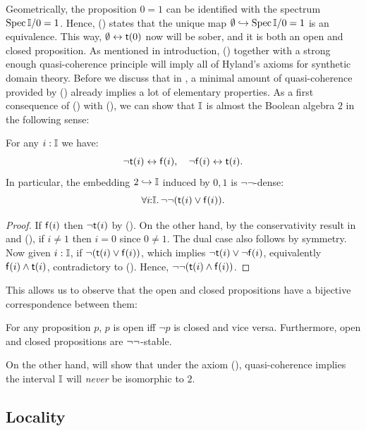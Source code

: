 \PrintAxiomNT

Geometrically, the proposition $0 = 1$ can be identified with the spectrum $\operatorname{Spec}\mathbb{I}/0=1$. Hence, (\AxiomNT) states that the unique map $\emptyset \hookrightarrow \operatorname{Spec}\mathbb{I}/0=1$ is an equivalence.
This way, $\emptyset \leftrightarrow \mathsf{t}(0)$ now will be sober, and it is both an open and closed proposition. As mentioned in introduction, (\AxiomNT) together with a strong enough quasi-coherence principle will imply all of Hyland's axioms for synthetic domain theory. Before we discuss that in , a minimal amount of quasi-coherence provided by (\AxiomSQCI) already implies a lot of elementary properties. As a first consequence of (\AxiomNT) with (\AxiomSQCI), we can show that $\mathbb{I}$ is almost the Boolean algebra $2$ in the following sense:

\begin{proposition}[\AxiomNT, \AxiomSQCID]\label{prop:filed}
  For any $i : \mathbb{I}$ we have:
  \[ \neg \ist{i} \eq \isf{i}, \quad \neg\isf{i} \eq \ist{i}\text{.} \]
  In particular, the embedding $2 \hookrightarrow \mathbb{I}$ induced by $0,1$ is $\neg\neg$-dense:
  \[ \fa i\I \dneg(\ist{i} \vee \isf{i})\text{.} \]
\end{proposition}
\begin{proof}
  If $\mathsf{f}(i)$ then $\neg\mathsf{t}(i)$ by (\AxiomNT). On the other hand, by the conservativity result in  and (\AxiomNT), if $i \neq 1$ then $i = 0$ since $0 \neq 1$. The dual case also follows by symmetry. Now given $i :\mathbb{I}$, if $\neg(\mathsf{t}(i) \vee \mathsf{f}(i))$, which implies $\neg\mathsf{t}(i) \vee \neg\mathsf{f}(i)$, equivalently $\mathsf{f}(i) \wedge \mathsf{t}(i)$, contradictory to (\AxiomNT). Hence, $\neg\neg(\mathsf{t}(i) \wedge \mathsf{f}(i))$.
\end{proof}

This allows us to observe that the open and closed propositions have a bijective correspondence between them:

\begin{corollary}[\AxiomNT, \AxiomSQCID]\label{cor:opendnegclose}
  For any proposition $p$, $p$ is open iff $\neg p$ is closed and vice versa. Furthermore, open and closed propositions are $\neg\neg$-stable.
\end{corollary}

On the other hand,  will show that under the axiom (\AxiomNT), quasi-coherence implies the interval $\mathbb{I}$ will \emph{never} be isomorphic to $2$. 

\subsection{Locality}

